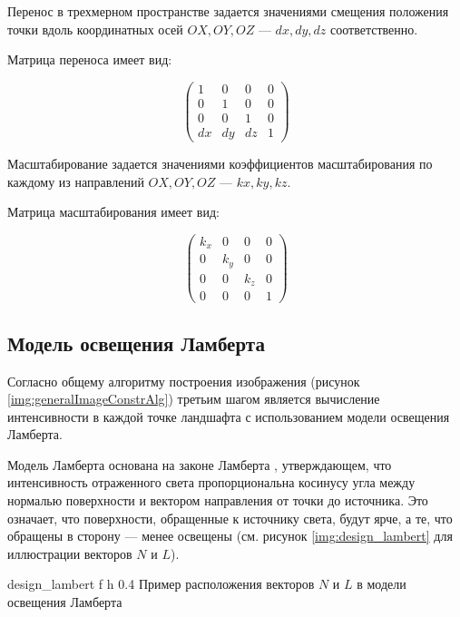Перенос в трехмерном пространстве задается значениями смещения положения точки вдоль координатных осей $OX, OY, OZ$ --- $dx, dy, dz$ соответственно.

Матрица переноса имеет вид:

\begin{equation}
	\label{mtr:move}
	\begin{pmatrix}
		1  & 0  & 0  & 0 \\
		0  & 1  & 0  & 0 \\
		0  & 0  & 1  & 0 \\
		dx & dy	& dz & 1
	\end{pmatrix}
\end{equation}

Масштабирование задается значениями коэффициентов масштабирования по каждому из направлений $OX, OY, OZ$ --- $kx, ky, kz$.

Матрица масштабирования имеет вид:

\begin{equation}
	\label{mtr:scale}
	\begin{pmatrix}
		k_x & 0   & 0   & 0 \\
		0   & k_y & 0   & 0 \\
		0   & 0   & k_z & 0 \\
		0   & 0	  & 0   & 1
	\end{pmatrix}
\end{equation}

\subsection{Модель освещения Ламберта}

Согласно общему алгоритму построения изображения (рисунок \ref{img:generalImageConstrAlg}) третьим шагом является вычисление интенсивности в каждой точке ландшафта с использованием модели освещения Ламберта.

Модель Ламберта основана на законе Ламберта \cite{info_lightLambert}, утверждающем, что интенсивность отраженного света пропорциональна косинусу угла между нормалью поверхности и вектором направления от точки до источника. 
Это означает, что поверхности, обращенные к источнику света, будут ярче, а те, что обращены в сторону --- менее освещены (см. рисунок \ref{img:design_lambert} для иллюстрации векторов $N$ и $L$).

\clearpage

{design_lambert} %
{f} %
{h} %
{0.4\textwidth} %
{Пример расположения векторов $N$ и $L$ в модели освещения Ламберта \cite{info_lightModels}} %


